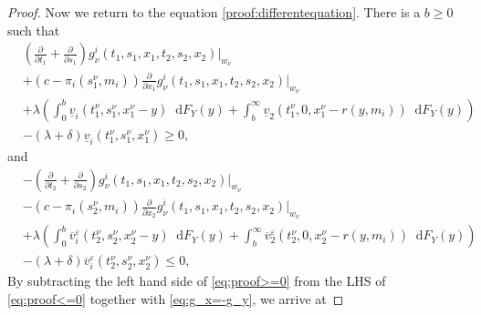 \documentclass[10pt,a4paper]{amsart}
\newcommand*\diff{\mathop{}\!\mathrm{d}}
\begin{document}
\begin{proof}
    \noindent
    Now we return to the equation \eqref{proof:differentequation}. There is a $b\geq 0$ such that
    \begin{align}
    \label{eq:proof>=0}
        &\left(\frac{\partial}{\partial t_1}+\frac{\partial}{\partial s_1}\right) g_{\nu}^i(t_1,s_1,x_1,t_2,s_2,x_2)|_{w_{\nu}} \nonumber \\&+\left(c-\pi_i(s_1^\nu,m_i)\right)\frac{\partial}{\partial x_1}g_{\nu}^i(t_1,s_1,x_1,t_2,s_2,x_2)|_{w_{\nu}} \nonumber \\
    &+ \lambda \left(\int_{0}^{b}\underline{v}_i(t_1^\nu,s_1^\nu,x_1^\nu-y)\diff F_Y(y) \nonumber 
    +\int_{b}^{\infty}\underline{v}_2(t_1^\nu,0,x_1^\nu-r(y,m_i))\diff F_Y(y)\right) \\&- (\lambda+\delta) \underline{v}_i(t_1^\nu,s_1^\nu,x_1^\nu) \geq 0,
    \end{align}
    and 
    \begin{align}
    \label{eq:proof<=0}
        &-\left(\frac{\partial}{\partial t_2}+\frac{\partial}{\partial s_2}\right) g_{\nu}^i(t_1,s_1,x_1,t_2,s_2,x_2)|_{w_{\nu}}\\
        &-\left(c-\pi_i(s_2^\nu,m_i)\right)\frac{\partial}{\partial x_2}g_{\nu}^i(t_1,s_1,x_1,t_2,s_2,x_2)|_{w_{\nu}} \nonumber \\
    &+ \lambda \left(\int_{0}^{b}\overline{v}^\varepsilon_i(t_2^\nu,s_2^\nu,x_2^\nu-y)\diff F_Y(y) \nonumber 
    +\int_{b}^{\infty}\overline{v}^\varepsilon_2(t_2^\nu,0,x_2^\nu-r(y,m_i))\diff F_Y(y)\right) \\&- (\lambda+\delta) \overline{v}^\varepsilon_i(t_2^\nu,s_2^\nu,x_2^\nu) \leq 0,
    \end{align}
    By subtracting the left hand side of \eqref{eq:proof>=0} from the LHS of \eqref{eq:proof<=0} together with \eqref{eq:g_x=-g_y}, we arrive at
  

\end{proof}
\end{document}

